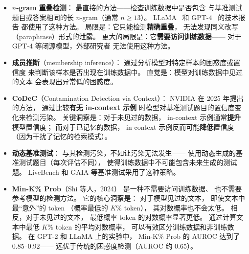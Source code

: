 \begin{itemize}[noitemsep]
  \item \textbf{$n$-gram 重叠检测}：
        最直接的方法——检查训练数据中是否包含
        与基准测试题目或答案相同的长 $n$-gram（通常 $n \geq 13$）。
        LLaMA~\cite{touvron2023llama} 和
        GPT-4~\cite{openai2023gpt4} 的技术报告
        都使用了这种方法。
        局限是：它只能检测\textbf{精确重叠}，
        无法发现同义改写（paraphrase）形式的泄露。
        更大的局限是：它\textbf{需要访问训练数据}——
        对于 GPT-4 等闭源模型，外部研究者
        无法使用这种方法。
  \item \textbf{成员推断}（membership inference）：
        通过分析模型对特定样本的困惑度或置信度
        来判断该样本是否出现在训练数据中。
        直觉是：模型对训练数据中见过的文本
        会表现出异常低的困惑度。
  \item \textbf{CoDeC}（Contamination Detection via Context）：
        NVIDIA 在 2025 年提出的方法，
        通过比较\textbf{有无 in-context 示例}
        时模型对基准测试题目的置信度变化来检测污染。
        关键洞察是：对于未见过的数据，
        in-context 示例通常\textbf{提升}模型置信度；
        而对于已记忆的数据，
        in-context 示例反而可能\textbf{降低}置信度
        （因为干扰了记忆的检索模式）。
  \item \textbf{动态基准测试}：
        与其检测污染，不如让污染无法发生——
        使用动态生成的基准测试题目（每次评估不同），
        使得训练数据中不可能包含未来生成的测试题。
        LiveBench 和 GAIA 等基准测试采用了这种策略。
  \item \textbf{Min-K\% Prob}（Shi 等人，2024）%
        是一种不需要访问训练数据、
        也不需要参考模型的检测方法。
        它的核心洞察是：
        对于模型见过的文本，
        即使文本中最``意外''的 token
        （概率最低的 $K\%$ token），
        其对数概率也不会太低。
        相反，对于未见过的文本，
        最低概率 token 的对数概率显著更低。
        通过计算文本中最低 $K\%$ token 的平均对数概率，
        可以有效区分训练数据和非训练数据。
        在 GPT-2 和 LLaMA 上的实验中，
        Min-K\% Prob 的 AUROC 达到了 0.85--0.92——
        远优于传统的困惑度检测（AUROC 约 0.65）。
\end{itemize}

